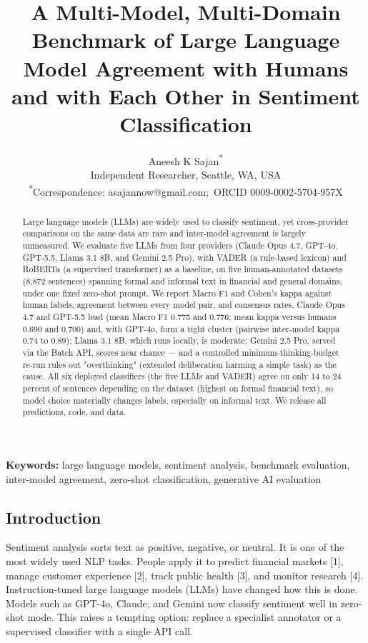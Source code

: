 \documentclass[11pt]{article}
\title{A Multi-Model, Multi-Domain Benchmark of Large Language Model Agreement with Humans and with Each Other in Sentiment Classification}
\author{Aneesh K Sajan\textsuperscript{*}\\[2pt]\normalsize Independent Researcher, Seattle, WA, USA\\[2pt]\normalsize \textsuperscript{*}Correspondence: asajannow@gmail.com;\ ORCID 0009-0002-5704-957X}
\date{}
\begin{document}
\maketitle
\begin{abstract}
\noindent Large language models (LLMs) are widely used to classify sentiment, yet cross-provider comparisons on the same data are rare and inter-model agreement is largely unmeasured. We evaluate five LLMs from four providers (Claude Opus 4.7, GPT-4o, GPT-5.5, Llama 3.1 8B, and Gemini 2.5 Pro), with VADER (a rule-based lexicon) and RoBERTa (a supervised transformer) as a baseline, on five human-annotated datasets (8,872 sentences) spanning formal and informal text in financial and general domains, under one fixed zero-shot prompt. We report Macro F1 and Cohen's kappa against human labels, agreement between every model pair, and consensus rates. Claude Opus 4.7 and GPT-5.5 lead (mean Macro F1 0.775 and 0.776; mean kappa versus humans 0.690 and 0.700) and, with GPT-4o, form a tight cluster (pairwise inter-model kappa 0.74 to 0.89); Llama 3.1 8B, which runs locally, is moderate; Gemini 2.5 Pro, served via the Batch API, scores near chance — and a controlled minimum-thinking-budget re-run rules out "overthinking" (extended deliberation harming a simple task) as the cause. All six deployed classifiers (the five LLMs and VADER) agree on only 14 to 24 percent of sentences depending on the dataset (highest on formal financial text), so model choice materially changes labels, especially on informal text. We release all predictions, code, and data.
\end{abstract}
\noindent\textbf{Keywords:} large language models, sentiment analysis, benchmark evaluation, inter-model agreement, zero-shot classification, generative AI evaluation
\vspace{6pt}

\subsection{Introduction}\label{introduction}

Sentiment analysis sorts text as positive, negative, or neutral. It is
one of the most widely used NLP tasks. People apply it to predict
financial markets {[}1{]}, manage customer experience {[}2{]}, track
public health {[}3{]}, and monitor research {[}4{]}. Instruction-tuned
large language models (LLMs) have changed how this is done. Models such
as GPT-4o, Claude, and Gemini now classify sentiment well in zero-shot
mode. This raises a tempting option: replace a specialist annotator or a
supervised classifier with a single API call.
\end{document}
